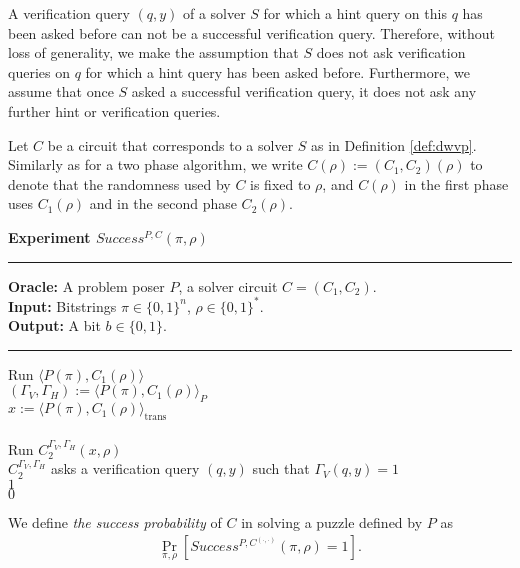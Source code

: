 A verification query $(q,y)$ of a solver $S$ for which a hint query on this $q$ has been asked before can not be a successful verification query.
Therefore, without loss of generality, we make the assumption that $S$ does not ask verification queries on $q$
for which a hint query has been asked before. Furthermore, we assume that once $S$ asked a successful verification query,
it does not ask any further hint or verification queries.

Let $C$ be a circuit that corresponds to a solver $S$ as in Definition \ref{def:dwvp}.
Similarly as for a two phase algorithm, we write $C(\rho) := (C_1, C_2)(\rho)$ to denote that the randomness used by $C$
is fixed to $\rho$, and $C(\rho)$ in the first phase uses $C_1(\rho)$ and in the second phase $C_2(\rho)$.
%
\begin{codeblock}
  \textbf{Experiment $Success^{P, C}(\pi, \rho) $}
  \medskip
  \hrule
  \medskip
  \textbf{Oracle:} A problem poser $P$, a solver circuit $C = (C_1, C_2)$.\\
  \textbf{Input:}  Bitstrings $\pi \in \{0,1\}^n$, $\rho \in \{0,1\}^*$.\\
  \textbf{Output:} A bit $b \in \{0,1\}$.
  \medskip\hrule\medskip
  Run $\langle P(\pi), C_1(\rho) \rangle$ \\
  \IndI $(\Gamma_V, \Gamma_H) := \langle P(\pi), C_1(\rho) \rangle_{P}$ \\
  \IndI $x := \langle P(\pi), C_1(\rho) \rangle_{\text{trans}}$ \\ \\
  Run $C_2^{\Gamma_V,\Gamma_H}(x, \rho)$ \\
  \IndI \If $C_2^{\Gamma_V, \Gamma_H}$ asks a verification query $(q, y)$ such that $\Gamma_V(q, y) = 1$ \then \\
  \IndII \return $1$ \\
  \return $0$ \\
\end{codeblock}
%
We define \textit{the success probability} of $C$ in solving a puzzle defined by $P$ as
\begin{align}
 \underset{\pi, \rho}{\Pr}[Success^{P,C^{(\cdot, \cdot)}}(\pi, \rho) = 1].
\end{align}
%
